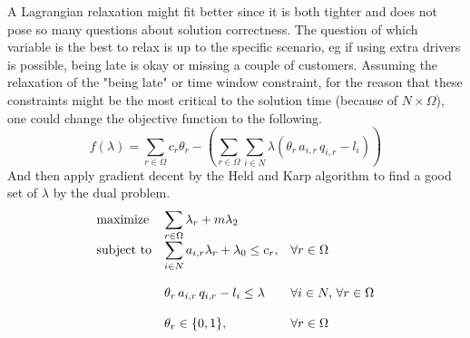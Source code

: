 \documentclass{article}
\begin{document}
    A Lagrangian relaxation might fit better since it is both tighter and does not pose so many questions about solution correctness.
    The question of which variable is the best to relax is up to the specific scenario, eg if using extra drivers is possible, being late is okay or missing a couple of customers.
    Assuming the relaxation of the "being late" or time window constraint, for the reason that these constraints might be the most critical to the solution time (because of $N \times \Omega$), one could change the objective function to the following.
    \[
        f(\lambda) = \displaystyle\sum_{r \in \Omega} c_r \theta_r - \left( \sum_{r \in \Omega} \sum_{i \in N} \lambda \left( \theta_r \, a_{i,r} \, q_{i,r} - l_i \right) \right)
    \]
    And then apply gradient decent by the Held and Karp algorithm to find a good set of $\lambda$ by the dual problem.
    \begin{equation*}
        \begin{array}{ll@{}ll}
            \text{maximize}  & \displaystyle \sum_{r \in \Omega}\lambda_r + m \lambda_2& &\\
            \text{subject to}& \displaystyle \sum_{i \in N} a_{i, r} \lambda_r  + \lambda_0 \leq c_r, && \forall r \in \Omega\\\\
            & \displaystyle \theta_r \, a_{i,r} \, q_{i,r} - l_i \leq \lambda & & \forall i \in N ,\, \forall r \in \Omega \\\\
            & \displaystyle \theta_r   \in \{0,1\},  && \forall r \in \Omega\\
        \end{array}
    \end{equation*}
    \clearpage
\end{document}
